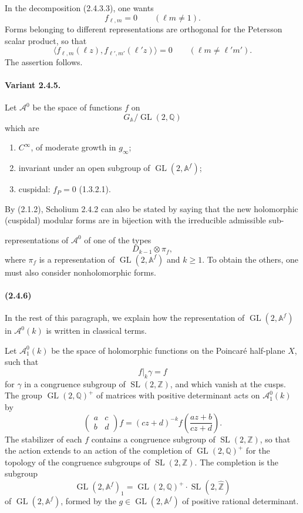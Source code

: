 \documentclass[10pt,a4paper]{article}
\providecommand{\GL}{\operatorname{GL}}
\providecommand{\SL}{\operatorname{SL}}
\providecommand{\Q}{\mathbb Q}
\providecommand{\Z}{\mathbb Z}
\providecommand{\A}{\mathbb A}
\providecommand{\Af}{\mathbb A^f}
\begin{document}
In the decomposition (2.4.3.3), one wants
\[
f_{\ell,m}=0\qquad(\ell m\ne1).
\]
Forms belonging to different representations are orthogonal for the Petersson scalar product, so that
\[
\langle f_{\ell,m}(\ell z),f_{\ell',m'}(\ell' z)\rangle=0
\qquad(\ell m\ne \ell' m').
\]
The assertion follows.

\paragraph{Variant 2.4.5.} Let \(\mathcal A^0\) be the space of functions \(f\) on
\[
G_{\A}/\GL(2,\Q)
\]
which are
\begin{enumerate}[label=(\alph*)]
\item \(C^\infty\), of moderate growth in \(g_\infty\);
\item invariant under an open subgroup of \(\GL(2,\Af)\);
\item cuspidal: \(f_P=0\) (1.3.2.1).
\end{enumerate}

By (2.1.2), Scholium 2.4.2 can also be stated by saying that the new holomorphic (cuspidal) modular forms are in bijection with the irreducible admissible sub-

\clearpage
{}
\hypertarget{authority-33}{}
representations of \(\mathcal A^0\) of one of the types
\[
D_{k-1}\otimes\pi_f,
\]
where \(\pi_f\) is a representation of \(\GL(2,\Af)\) and \(k\ge1\). To obtain the others, one must also consider nonholomorphic forms.

\paragraph{(2.4.6)} In the rest of this paragraph, we explain how the representation of \(\GL(2,\Af)\) in \(\mathcal A^0(k)\) is written in classical terms.

Let \(\mathcal A_1^0(k)\) be the space of holomorphic functions on the Poincaré half-plane \(X\), such that
\[
f|_k\gamma=f
\]
for \(\gamma\) in a congruence subgroup of \(\SL(2,\Z)\), and which vanish at the cusps. The group \(\GL(2,\Q)^+\) of matrices with positive determinant acts on \(\mathcal A_1^0(k)\) by
\[
\begin{pmatrix}a&c\\ b&d\end{pmatrix}f
=
(cz+d)^{-k}f\!\left(\frac{az+b}{cz+d}\right).
\]
The stabilizer of each \(f\) contains a congruence subgroup of \(\SL(2,\Z)\), so that the action extends to an action of the completion of \(\GL(2,\Q)^+\) for the topology of the congruence subgroups of \(\SL(2,\Z)\). The completion is the subgroup
\[
\GL(2,\Af)_1=\GL(2,\Q)^+\cdot\SL(2,\widehat{\Z})
\]
of \(\GL(2,\Af)\), formed by the \(g\in\GL(2,\Af)\) of positive rational determinant.
\end{document}
